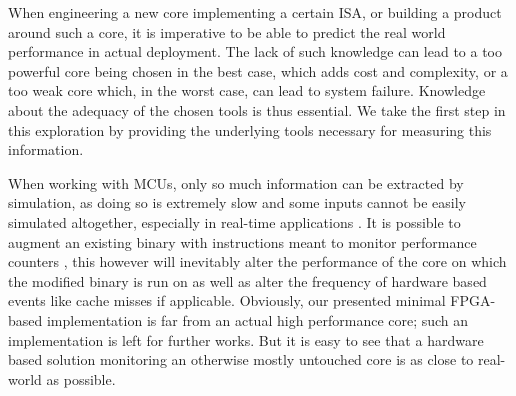 \documentclass[../bachelor_paper.tex]{subfiles}
\begin{document}
When engineering a new core implementing a certain \ac{ISA}, or building a product around such a core, it is imperative to be able to predict the real world performance in actual deployment. The lack of such knowledge can lead to a too powerful core being chosen in the best case, which adds cost and complexity, or a too weak core which, in the worst case, can lead to system failure. Knowledge about the adequacy of the chosen tools is thus essential. We take the first step in this exploration by providing the underlying tools necessary for measuring this information.

When working with \acp{MCU}, only so much information can be extracted by simulation, as doing so is extremely slow \cite{eeckhoutDesigningComputerArchitecture2003,kaoHardwareApproachRealTime2007} and some inputs cannot be easily simulated altogether, especially in real-time applications \cite{kaoHardwareApproachRealTime2007}. It is possible to augment an existing binary with instructions meant to monitor performance counters \cite{eeckhoutQuantifyingImpactInput}, this however will inevitably alter the performance of the core on which the modified binary is run on as well as alter the frequency of hardware based events like cache misses if applicable. Obviously, our presented minimal FPGA-based implementation is far from an actual high performance core; such an implementation is left for further works. But it is easy to see that a hardware based solution monitoring an otherwise mostly untouched core is as close to real-world as possible.
\end{document}
